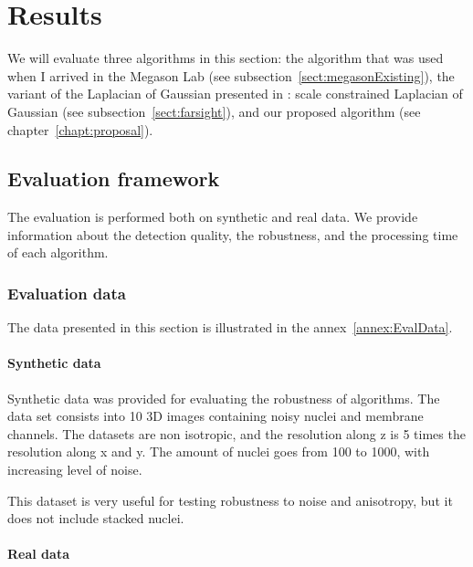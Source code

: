 
\chapter{Results}
\label{chapt:results}

We will evaluate three algorithms in this section:
the algorithm that was used when I arrived in the Megason Lab (see subsection~\ref{sect:megasonExisting}),
the variant of the Laplacian of Gaussian presented in \cite{al2009improved} : scale constrained Laplacian of Gaussian (see subsection~\ref{sect:farsight}),
and our proposed algorithm (see chapter~\ref{chapt:proposal}).






\section{Evaluation framework}

The evaluation is performed both on synthetic and real data. We provide information about the detection quality, the robustness, and the processing time of each algorithm.

\subsection{Evaluation data}

The data presented in this section is illustrated in the annex~\ref{annex:EvalData}.

\subsubsection{Synthetic data}

Synthetic data was provided for evaluating the robustness of algorithms.
The data set consists into 10 3D images containing noisy nuclei and membrane channels.
The datasets are non isotropic, and the resolution along z is 5 times the resolution along x and y.
The amount of nuclei goes from 100 to 1000, with increasing level of noise.

This dataset is very useful for testing robustness to noise and anisotropy, but it does not include stacked nuclei.


\subsubsection{Real data}

